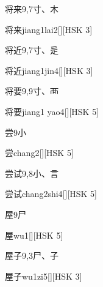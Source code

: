 \begin{Entry}{将来}{9,7}{⼨、⽊}
  \begin{Phonetics}{将来}{jiang1lai2}[][HSK 3]
  \end{Phonetics}
\end{Entry}

\begin{Entry}{将近}{9,7}{⼨、⾡}
  \begin{Phonetics}{将近}{jiang1jin4}[][HSK 3]
  \end{Phonetics}
\end{Entry}

\begin{Entry}{将要}{9,9}{⼨、⾑}
  \begin{Phonetics}{将要}{jiang1 yao4}[][HSK 5]
  \end{Phonetics}
\end{Entry}

\begin{Entry}{尝}{9}{⼩}
  \begin{Phonetics}{尝}{chang2}[][HSK 5]
  \end{Phonetics}
\end{Entry}

\begin{Entry}{尝试}{9,8}{⼩、⾔}
  \begin{Phonetics}{尝试}{chang2shi4}[][HSK 5]
  \end{Phonetics}
\end{Entry}

\begin{Entry}{屋}{9}{⼫}
  \begin{Phonetics}{屋}{wu1}[][HSK 5]
  \end{Phonetics}
\end{Entry}

\begin{Entry}{屋子}{9,3}{⼫、⼦}
  \begin{Phonetics}{屋子}{wu1zi5}[][HSK 3]
  \end{Phonetics}
\end{Entry}

